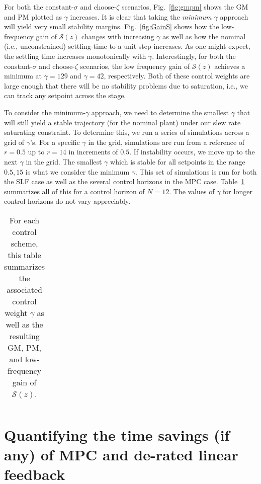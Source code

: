 \documentclass[journal,twocolumn,twoside]{IEEEtran}
\begin{document}
For both the constant-$\sigma$ and choose-$\zeta$ scenarios, Fig.~\ref{fig:gmpm} shows the GM and PM plotted as $\gamma$ increases. It is clear that taking the \emph{minimum $\gamma$} approach will yield very small stability margins. Fig.~\ref{fig:GainS} shows how the low-frequency gain of $\mathcal{S}(z)$ changes with increasing $\gamma$ as well as how the nominal (i.e., unconstrained) settling-time to a unit step increases. As one might expect, the settling time increases monotonically with $\gamma$. Interestingly, for both the constant-$\sigma$ and choose-$\zeta$ scenarios, the low frequency gain of $\mathcal{S}(z)$ achieves a minimum at $\gamma=129$ and $\gamma=42$, respectively. Both of these control weights are large enough that there will be no stability problems due to saturation, i.e., we can track any setpoint across the stage.

To consider the minimum-$\gamma$ approach, we need to determine the smallest $\gamma$ that will still yield a stable trajectory (for the nominal plant) under our slew rate saturating constraint. To determine this, we run a series of simulations across a grid of $\gamma$'s. For a specific $\gamma$ in the grid, simulations are run from a reference of $r=0.5$ up to $r=14$ in increments of $0.5$. If instability occurs, we move up to the next $\gamma$ in the grid. The smallest $\gamma$ which is stable for all setpoints in the range $0.5, 15$ is what we consider the minimum $\gamma$. This set of simulations is run for both the SLF case as well as the several control horizons in the MPC case. Table~\ref{tab:gmpms} summarizes all of this for a control horizon of $N=12$. The values of $\gamma$ for longer control horizons do not vary appreciably. 

\begin{table}
  \caption{For each control scheme, this table summarizes the associated control weight $\gamma$ as well as the resulting GM, PM, and low-frequency gain of $\mathcal{S}(z)$.}
  \label{tab:gmpms}
  \begin{tabular}{ccccc}
    
  \end{tabular}
\end{table}

\section{Quantifying the time savings (if any) of MPC and de-rated linear feedback}
\label{sec:org7edf36d}
\end{document}
